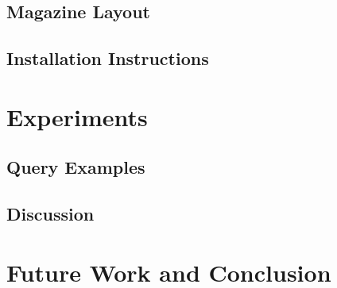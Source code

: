 \documentclass{acm_proc_article-sp}
\begin{document}
\subsection{Magazine Layout}

\subsection{Installation Instructions}

\section{Experiments}

\subsection{Query Examples}

\subsection{Discussion}

\section{Future Work and Conclusion}






\balancecolumns
\end{document}

